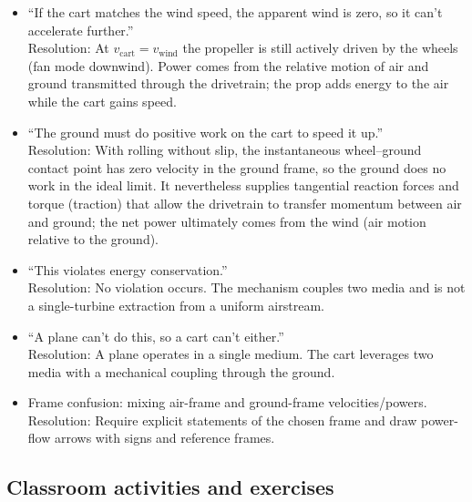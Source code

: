 \documentclass[reprint,aps,pra,longbibliography]{revtex4-2}
\begin{document}
\begin{itemize}
\item ``If the cart matches the wind speed, the apparent wind is zero, so it can't accelerate further.''
\\Resolution: At $v_\text{cart}=v_\text{wind}$ the propeller is still actively driven by the wheels (fan mode downwind). Power comes from the relative motion of air and ground transmitted through the drivetrain; the prop adds energy to the air while the cart gains speed.

\item ``The ground must do positive work on the cart to speed it up.''
\\Resolution: With rolling without slip, the instantaneous wheel--ground contact point has zero velocity in the ground frame, so the ground does no work in the ideal limit. It nevertheless supplies tangential reaction forces and torque (traction) that allow the drivetrain to transfer momentum between air and ground; the net power ultimately comes from the wind (air motion relative to the ground).

\item ``This violates energy conservation.''
\\Resolution: No violation occurs. The mechanism couples two media and is not a single-turbine extraction from a uniform airstream.

\item ``A plane can't do this, so a cart can't either.''
\\Resolution: A plane operates in a single medium. The cart leverages two media with a mechanical coupling through the ground.

\item Frame confusion: mixing air-frame and ground-frame velocities/powers.
\\Resolution: Require explicit statements of the chosen frame and draw power-flow arrows with signs and reference frames.
\end{itemize}

\subsection{Classroom activities and exercises}
\end{document}
